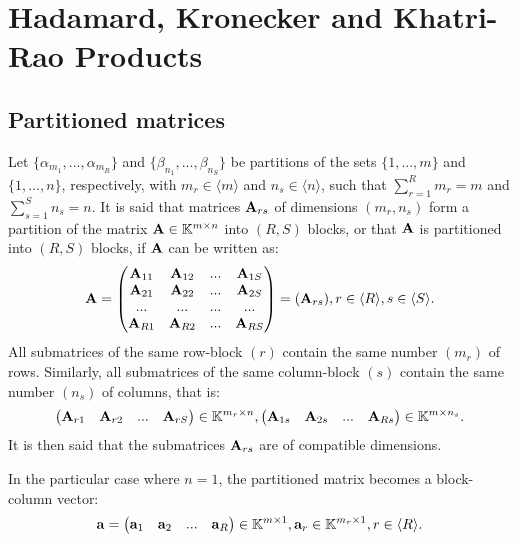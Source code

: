 \chapter{Hadamard, Kronecker and Khatri-Rao Products}

\section{Partitioned matrices}

Let $\{\alpha_{m_1},...,\alpha_{m_R}\}$
and $\{\beta_{n_1},...,\beta_{n_S}\}$
be partitions of the sets $\{1,...,m\}$
and $\{1,...,n\}$, respectively, with 
$m_r\in \langle m \rangle$ and $n_s\in\langle n\rangle$,
such that $\sum\limits_{r=1}^{R}m_r=m$ and $\sum\limits_{s=1}^{S}n_s=n$.
It is said that matrices $\bold{A}_{rs}$ of dimensions $(m_r,n_s)$
form a partition of the matrix $\bold{A}\in \mathbb{K}^{m\times n}$ into $(R,S)$ blocks,
or that $\bold{A}$ is partitioned into $(R,S)$ blocks, if $\bold{A}$ can be written as:
\begin{align*}
    \bold{A}=\begin{pmatrix}
        \bold{A}_{11}&\bold{A}_{12}&...&\bold{A}_{1S}\\
        \bold{A}_{21}&\bold{A}_{22}&...&\bold{A}_{2S}\\
        ...&...&...&...\\
        \bold{A}_{R1}&\bold{A}_{R2}&...&\bold{A}_{RS}\\
    \end{pmatrix}=(\bold{A}_{rs}), r\in\langle R\rangle, s\in\langle S\rangle.
\end{align*}
All submatrices of the same row-block $(r)$ contain the same number $(m_r)$ of rows.
Similarly, all submatrices of the same column-block $(s)$ contain the same number $(n_s)$ of columns,
that is:
\begin{align*}
    \begin{pmatrix}
        \bold{A}_{r1}&\bold{A}_{r2}&...&\bold{A}_{rS}
    \end{pmatrix}\in \mathbb{K}^{m_r\times n},
    \begin{pmatrix}
        \bold{A}_{1s}&\bold{A}_{2s}&...&\bold{A}_{Rs}
    \end{pmatrix}\in \mathbb{K}^{m\times n_s}.
\end{align*}
It is then said that the submatrices $\bold{A}_{rs}$ are of compatible dimensions.
\par
In the particular case where $n=1$,
the partitioned matrix becomes a block-column vector:
\begin{align*}
    \bold{a}=\begin{pmatrix}
        \bold{a}_1&\bold{a}_2&...&\bold{a}_{R}
    \end{pmatrix}\in \mathbb{K}^{m\times 1},
    \bold{a}_r\in \mathbb{K}^{m_r\times 1},r\in \langle R\rangle.
\end{align*}
